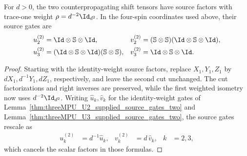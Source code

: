 \begin{lemma}
    \label{thm:threeMPU_normalized_source_gates}
    \leanok
    For $d>0$, the two counterpropagating shift tensors have source factors
    with trace-one weight $\rho=d^{-2}\Id_{d^2}$. In the four-spin coordinates
    used above, their source gates are
    \begin{align}
        u_2^{(2)} & = \Id\otimes\mathbb S\otimes \Id,
                  & v_2^{(2)}                                                      & = (\mathbb S\otimes\mathbb S)(\Id\otimes\mathbb S\otimes \Id), \\
        u_3^{(2)} & = (\Id\otimes\mathbb S\otimes \Id)(\mathbb S\otimes\mathbb S),
                  & v_3^{(2)}                                                      & = \Id\otimes\mathbb S\otimes \Id.
    \end{align}
\end{lemma}
\begin{proof}\leanok
    Starting with the identity-weight source factors, replace
    $X_1,Y_1,Z_1$ by $dX_1,d^{-1}Y_1,dZ_1$, respectively, and leave the
    second cut unchanged. The cut factorizations and right inverses are
    preserved, while the first weighted isometry now uses $d^{-2}\Id_{d^2}$.
    Writing $\hat u_k,\hat v_k$ for the identity-weight gates of
    Lemma~\ref{thm:threeMPU_U2_supplied_source_gates_two} and
    Lemma~\ref{thm:threeMPU_U3_supplied_source_gates_two}, the source gates
    rescale as
    \begin{align}
        u_k^{(2)} & = d^{-1}\hat u_k, & v_k^{(2)} & = d\,\hat v_k, & k & = 2,3,
    \end{align}
    which cancels the scalar factors in those formulas.
\end{proof}

